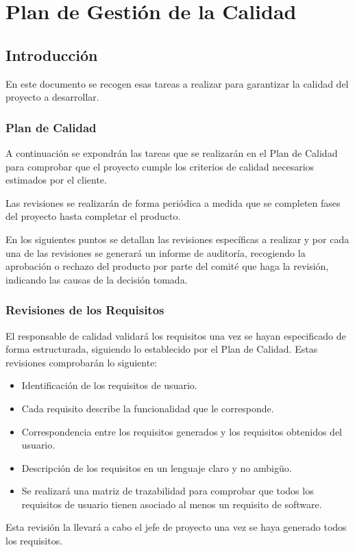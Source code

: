 \section{Plan de Gestión de la Calidad} \label{sec:calidad}
\subsection{Introducción}
\par En este documento se recogen esas tareas a realizar para garantizar la calidad del proyecto a desarrollar.

\subsubsection{Plan de Calidad}
\par A continuación se expondrán las tareas que se realizarán en el Plan de Calidad para comprobar que el proyecto cumple los criterios de calidad necesarios estimados por el cliente.

Las revisiones se realizarán de forma periódica a medida que se completen fases del proyecto hasta completar el producto.

En los siguientes puntos se detallan las revisiones específicas a realizar y por cada una de las revisiones se generará un informe de auditoría, recogiendo la aprobación o rechazo del producto por parte del comité que haga la revisión, indicando las causas de la decisión tomada.

\subsubsection{Revisiones de los Requisitos}
\par El responsable de calidad validará los requisitos una vez se hayan especificado de forma estructurada, siguiendo lo establecido por el Plan de Calidad. Estas revisiones comprobarán lo siguiente:
\begin{itemize}[-]
  \item Identificación de los requisitos de usuario.
  \item Cada requisito describe la funcionalidad que le corresponde.
  \item Correspondencia entre los requisitos generados y los requisitos obtenidos del usuario.
  \item Descripción de los requisitos en un lenguaje claro y no ambigüo.
  \item Se realizará una matriz de trazabilidad para comprobar que todos los requisitos de usuario tienen asociado al menos un requisito de software.
\end{itemize}
\par Esta revisión la llevará a cabo el jefe de proyecto una vez se haya generado todos los requisitos.


